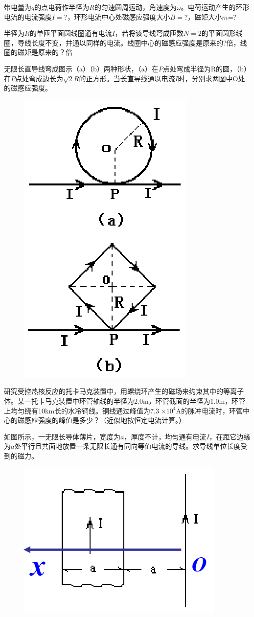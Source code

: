 \documentclass[lang=cn,10pt]{elegantbook}
\begin{document}
	\begin{exercise}
		带电量为$q$的点电荷作半径为$R$的匀速圆周运动，角速度为$\omega$。电荷运动产生的环形电流的电流强度$I =$?，环形电流中心处磁感应强度大小$B =$?，磁矩大小$m $=?
	\end{exercise}
	\begin{exercise}
		半径为$R$的单匝平面圆线圈通有电流$I$，若将该导线弯成匝数$N=2$的平面圆形线圈，导线长度不变，并通以同样的电流。线圈中心的磁感应强度是原来的?倍，线圈的磁矩是原来的？倍
	\end{exercise}
	\begin{exercise}
		无限长直导线弯成图示（a）（b）两种形状，（a）在$P$点处弯成半径为R的圆，（b）在$P$点处弯成边长为$\sqrt{2}R$的正方形。当长直导线通以电流$I$时，分别求两图中O处的磁感应强度。
		
		
\begin{figure}[H]
	\centering
	\includegraphics[width=0.18\linewidth]{image/图片18}
	\caption{}
	\label{fig:18}
\end{figure}
	\end{exercise}
	\begin{exercise}
		研究受控热核反应的托卡马克装置中，用螺绕环产生的磁场来约束其中的等离子体。某一托卡马克装置中环管轴线的半径为2.0m，环管截面的半径为1.0m，环管上均匀绕有10km长的水冷铜线。铜线通过峰值为7.3$\times
		$$10^{4}$A的脉冲电流时，环管中心的磁感应强度的峰值是多少？（近似地按恒定电流计算。）
	\end{exercise}
	\begin{exercise}
		如图所示，一无限长导体薄片，宽度为$a$，厚度不计，均匀通有电流$I$，在距它边缘为$a$处平行且共面地放置一条无限长通有同向等值电流的导线。求导线单位长度受到的磁力。
		
		
\begin{figure}[H]
	\centering
	\includegraphics[width=0.18\linewidth]{image/图片19}
	\caption{}
	\label{fig:19}
\end{figure}
	\end{exercise}
\end{document}
